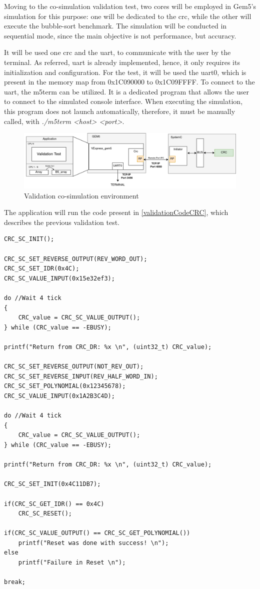 Moving to the co-simulation validation test, two cores will be employed in Gem5's simulation for this purpose: one will be dedicated to the 
\gls{crc}, while the other will execute the bubble-sort benchmark. The simulation will be conducted in sequential mode, since 
the main objective is not performance, but accuracy.

It will be used one \gls{crc} and the \gls{uart}, to communicate with the user by the terminal.
As referred, \gls{uart} is already implemented, hence, it only requires its initialization and configuration. For the test, it will be used the 
\gls{uart}0, which is present in the memory map from 0x1C090000 to 0x1C09FFFF.
To connect to the \gls{uart}, the m5term can be utilized. It is
a dedicated program that allows the user to connect to the simulated console interface. When executing the simulation, this program does not
launch automatically, therefore, it must be manually called, with \textit{./m5term <host> <port>}.

\begin{figure}[H]
	\centering
 	\includegraphics[width=1\linewidth]{Images/CoSimDesign_Validation.png} 
 	\caption{Validation co-simulation environment}
	\label{fig_CoSimDesign_Validation}
\end{figure}

The application will run the code present in \ref{validationCodeCRC}, which describes the previous validation test. 

\newpage

\begin{lstlisting}[style=customC, caption={CRC validation code}, label=validationCodeCRC]
CRC_SC_INIT();

CRC_SC_SET_REVERSE_OUTPUT(REV_WORD_OUT);
CRC_SC_SET_IDR(0x4C);
CRC_SC_VALUE_INPUT(0x15e32ef3);       

do //Wait 4 tick
{
	CRC_value = CRC_SC_VALUE_OUTPUT();
} while (CRC_value == -EBUSY);

printf("Return from CRC_DR: %x \n", (uint32_t) CRC_value);

CRC_SC_SET_REVERSE_OUTPUT(NOT_REV_OUT);
CRC_SC_SET_REVERSE_INPUT(REV_HALF_WORD_IN);
CRC_SC_SET_POLYNOMIAL(0x12345678);
CRC_SC_VALUE_INPUT(0x1A2B3C4D);

do //Wait 4 tick
{
	CRC_value = CRC_SC_VALUE_OUTPUT();
} while (CRC_value == -EBUSY);

printf("Return from CRC_DR: %x \n", (uint32_t) CRC_value); 

CRC_SC_SET_INIT(0x4C11DB7);

if(CRC_SC_GET_IDR() == 0x4C)
	CRC_SC_RESET();

if(CRC_SC_VALUE_OUTPUT() == CRC_SC_GET_POLYNOMIAL())
	printf("Reset was done with success! \n");
else
	printf("Failure in Reset \n");

break;
\end{lstlisting}


